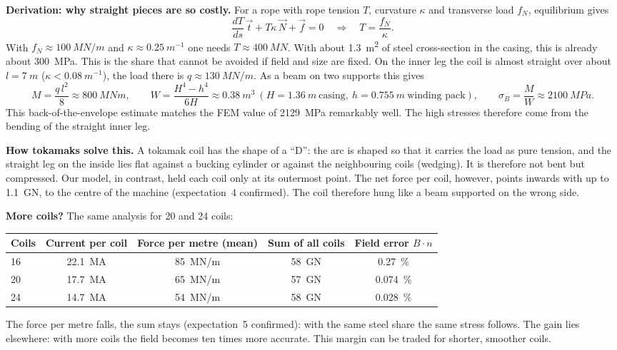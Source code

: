 \textbf{Derivation: why straight pieces are so costly.} For a rope with rope tension $T$, curvature $\kappa$ and
transverse load $f_N$, equilibrium gives
\[
\frac{dT}{ds}\,\vec t + T\kappa\,\vec N + \vec f = 0 \quad\Rightarrow\quad T = \frac{f_N}{\kappa}.
\]
With $f_N \approx \SI{100}{MN/m}$ and $\kappa \approx \SI{0.25}{m^{-1}}$ one needs $T \approx \SI{400}{MN}$. With about
\SI{1.3}{m^2} of steel cross-section in the casing, this is already about \SI{300}{MPa}. This is the share that cannot be
avoided if field and size are fixed. On the inner leg the coil is almost straight over about $l = \SI{7}{m}$
($\kappa < \SI{0.08}{m^{-1}}$), the load there is $q \approx \SI{130}{MN/m}$. As a beam on two supports this gives
\[
M = \frac{q\,l^2}{8} \approx \SI{800}{MNm},\qquad
W = \frac{H^4 - h^4}{6H} \approx \SI{0.38}{m^3}\ (H = \SI{1.36}{m}\ \text{casing},\ h = \SI{0.755}{m}\ \text{winding pack}),
\qquad \sigma_B = \frac{M}{W} \approx \SI{2100}{MPa}.
\]
This back-of-the-envelope estimate matches the FEM value of \SI{2129}{MPa} remarkably well. The high stresses therefore
come from the bending of the straight inner leg.

\textbf{How tokamaks solve this.} A tokamak coil has the shape of a “D”: the arc is shaped so that it carries the load
as pure tension, and the straight leg on the inside lies flat against a bucking cylinder or against the neighbouring
coils (wedging). It is therefore not bent but compressed. Our model, in contrast, held each coil only at its outermost
point. The net force per coil, however, points inwards with up to \SI{1.1}{GN}, to the centre of the machine
(expectation~4 confirmed). The coil therefore hung like a beam supported on the wrong side.

\textbf{More coils?} The same analysis for 20 and 24 coils:
\begin{center}\small
\begin{tabular}{lcccc}
\toprule
Coils & Current per coil & Force per metre (mean) & Sum of all coils & Field error $B\cdot n$ \\
\midrule
16 & \SI{22.1}{MA} & \SI{85}{MN/m} & \SI{58}{GN} & 0.27~\% \\
20 & \SI{17.7}{MA} & \SI{65}{MN/m} & \SI{57}{GN} & 0.074~\% \\
24 & \SI{14.7}{MA} & \SI{54}{MN/m} & \SI{58}{GN} & 0.028~\% \\
\bottomrule
\end{tabular}
\end{center}
The force per metre falls, the sum stays (expectation~5 confirmed): with the same steel share the same stress follows.
The gain lies elsewhere: with more coils the field becomes ten times more accurate. This margin can be traded for
shorter, smoother coils.

